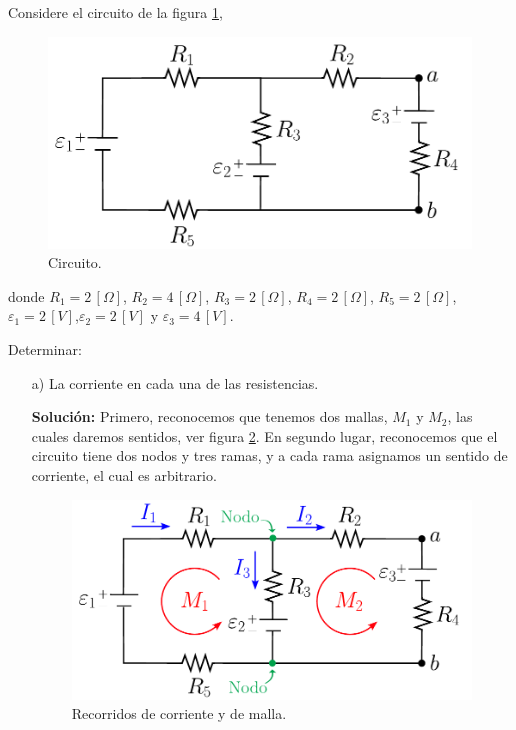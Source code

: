 \begin{ejemplo}
    Considere el circuito de la figura \ref{fig:Ej-2-Circuito},

\begin{figure}[H]
    \centering
    \includegraphics[scale = 0.67]{Figuras/Ej-2-Kirchoff.pdf}
    \caption{Circuito.}
    \label{fig:Ej-2-Circuito}
\end{figure}

donde $R_1 = 2 \,[\Omega]$, $R_2 = 4 \,[\Omega]$, $R_3 = 2 \,[\Omega]$, $R_4 = 2 \, [\Omega]$, $R_5 = 2 \,[\Omega]$, $\varepsilon_1 = 2 \,[V]$,$ \varepsilon_2 = 2 \,[V]$ y $\varepsilon_3 = 4 \,[V]$.

Determinar:
\begin{itemize}
\item[a)] La corriente en cada una de las resistencias.

\textbf{Solución:} Primero, reconocemos que tenemos dos mallas, $M_1$ y $M_2$, las cuales daremos sentidos, ver figura \ref{fig:Ej-2-Recorridos}. En segundo lugar, reconocemos que el circuito tiene dos nodos y tres ramas, y a cada rama asignamos un sentido de corriente, el cual es arbitrario.

\begin{figure}[H]
    \centering
    \includegraphics[scale = 0.67]{Figuras/Ej-2-Kirchoff-Recorridos.pdf}
    \caption{Recorridos de corriente y de malla.}
    \label{fig:Ej-2-Recorridos}
\end{figure}


\end{itemize}
\end{ejemplo}
